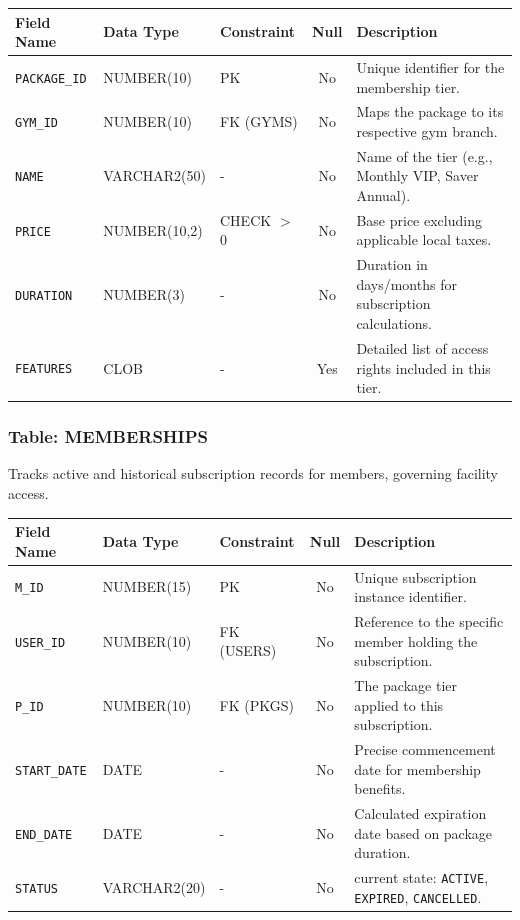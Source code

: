 \documentclass[
  12pt,
  a4paperpaper,
]{report}
\newcounter{none} %
\begin{document}
{\def\LTcaptype{none}
\begin{longtable}[]{@{}lllc p{6cm}@{}}
\hline
\textbf{Field Name} & \textbf{Data Type} & \textbf{Constraint} & \textbf{Null} & \textbf{Description} \\
\hline
\endhead
\hline
\endlastfoot
\texttt{PACKAGE\_ID} & NUMBER(10) & PK & No & Unique identifier for the membership tier. \\
\texttt{GYM\_ID} & NUMBER(10) & FK (GYMS) & No & Maps the package to its respective gym branch. \\
\texttt{NAME} & VARCHAR2(50) & - & No & Name of the tier (e.g., Monthly VIP, Saver Annual). \\
\texttt{PRICE} & NUMBER(10,2) & CHECK $>$ 0 & No & Base price excluding applicable local taxes. \\
\texttt{DURATION} & NUMBER(3) & - & No & Duration in days/months for subscription calculations. \\
\texttt{FEATURES} & CLOB & - & Yes & Detailed list of access rights included in this tier. \\
\hline
\end{longtable}
}

\subsubsection{Table: MEMBERSHIPS}
Tracks active and historical subscription records for members, governing facility access.

{\def\LTcaptype{none}
\begin{longtable}[]{@{}lllc p{6cm}@{}}
\hline
\textbf{Field Name} & \textbf{Data Type} & \textbf{Constraint} & \textbf{Null} & \textbf{Description} \\
\hline
\endhead
\hline
\endlastfoot
\texttt{M\_ID} & NUMBER(15) & PK & No & Unique subscription instance identifier. \\
\texttt{USER\_ID} & NUMBER(10) & FK (USERS) & No & Reference to the specific member holding the subscription. \\
\texttt{P\_ID} & NUMBER(10) & FK (PKGS) & No & The package tier applied to this subscription. \\
\texttt{START\_DATE} & DATE & - & No & Precise commencement date for membership benefits. \\
\texttt{END\_DATE} & DATE & - & No & Calculated expiration date based on package duration. \\
\texttt{STATUS} & VARCHAR2(20) & - & No & current state: \texttt{ACTIVE}, \texttt{EXPIRED}, \texttt{CANCELLED}. \\
\hline
\end{longtable}
}
\end{document}
